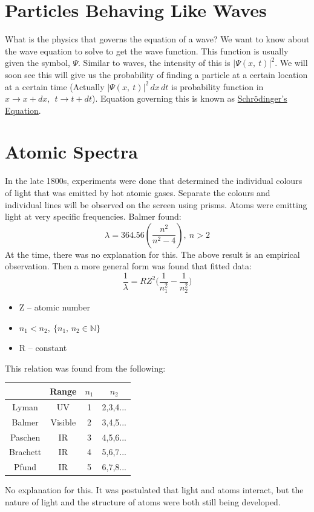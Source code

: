 \documentclass[a4paper, 11pt, normalem]{report}
\begin{document}
\section{Particles Behaving Like Waves}
What is the physics that governs the equation of a wave? 
We want to know about the wave equation to solve to get the wave function.
This function is usually given the symbol, $\Psi$.
Similar to waves, the intensity of this is $|\Psi(x,\:t)|^{2}$.
We will soon see this will give us the probability of finding a particle at a certain location at a certain time
(Actually $|\Psi(x,\:t)|^{2}\,dx\,dt$ is probability function in $x \rightarrow x + dx,~~t \rightarrow t + dt$).
Equation governing this is known as \underline{Schr\"{o}dinger's Equation}.

\section{Atomic Spectra}
In the late 1800s, experiments were done that determined the individual colours of light that was emitted by hot atomic gases.
Separate the colours and individual lines will be observed on the screen using prisms.
Atoms were emitting light at very specific frequencies.
Balmer found:
\begin{equation}
    \lambda = 364.56\left(\frac{n^{2}}{n^{2} - 4}\right),~n > 2
\end{equation}
At the time, there was no explanation for this.
The above result is an empirical observation.
Then a more general form was found that fitted data:
\begin{equation}
    \frac{1}{\lambda} = RZ^{2}\Big(\frac{1}{n_{1}^{2}} - \frac{1}{n_{2}^{2}}\Big)
\end{equation}
\begin{itemize}
    \item Z -- atomic number
    \item $n_{1} < n_{2},~\{n_{1},\,n_{2} \in \mathbb{N}\}$
    \item R -- constant
\end{itemize}
This relation was found from the following:
\begin{table}[H]
    \centering
    \begin{tabular}{|c|ccc|}
        \hline
        \rowcolor{lightgray} & Range   & $n_{1}$ & $n_{2}$\\
        \hline
        Lyman    & UV      & 1       & 2,3,4... \\
        Balmer   & Visible & 2       & 3,4,5... \\
        Paschen  & IR      & 3       & 4,5,6... \\
        Brachett & IR      & 4       & 5,6,7... \\
        Pfund    & IR      & 5       & 6,7,8... \\
        \hline
    \end{tabular}
\end{table}
No explanation for this.
It was postulated that light and atoms interact, but the nature of light and the structure of atoms were both still being developed.
\end{document}
